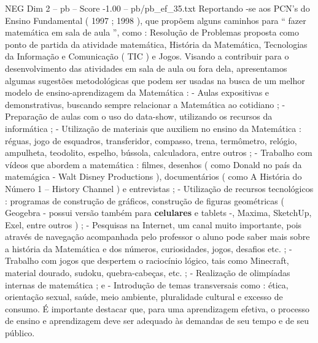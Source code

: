 \begin{textsample}{NEG Dim 2 – pb – Score -1.00 – pb/pb\_ef\_35.txt}
Reportando -se aos PCN’s do Ensino Fundamental ( 1997 ; 1998 ), que propõem alguns caminhos para “ fazer matemática em sala de aula ”, como : Resolução de Problemas proposta como ponto de partida da atividade matemática, História da Matemática, Tecnologias da Informação e Comunicação ( TIC ) e Jogos.
Visando a contribuir para o desenvolvimento das atividades em sala de aula ou fora dela, apresentamos algumas sugestões metodológicas que podem ser usadas na busca de um melhor modelo de ensino-aprendizagem da Matemática : - Aulas expositivas e demonstrativas, buscando sempre relacionar a Matemática ao cotidiano ; - Preparação de aulas com o uso do data-show, utilizando os recursos da informática ; - Utilização de materiais que auxiliem no ensino da Matemática : réguas, jogo de esquadros, transferidor, compasso, trena, termômetro, relógio, ampulheta, teodolito, espelho, bússola, calculadora, entre outros ; - Trabalho com vídeos que abordem a matemática : filmes, desenhos ( como Donald no país da matemágica - Walt Disney Productions ), documentários ( como A História do Número 1 – History Channel ) e entrevistas ; - Utilização de recursos tecnológicos : programas de construção de gráficos, construção de figuras geométricas ( Geogebra - possui versão também para \textbf{celulares} e tablets -, Maxima, SketchUp, Exel, entre outros ) ; - Pesquisas na Internet, um canal muito importante, pois através de navegação acompanhada pelo professor o aluno pode saber mais sobre a história da Matemática e dos números, curiosidades, jogos, desafios etc. ; - Trabalho com jogos que despertem o raciocínio lógico, tais como Minecraft, material dourado, sudoku, quebra-cabeças, etc. ; - Realização de olimpíadas internas de matemática ; e - Introdução de temas transversais como : ética, orientação sexual, saúde, meio ambiente, pluralidade cultural e excesso de consumo.
É importante destacar que, para uma aprendizagem efetiva, o processo de ensino e aprendizagem deve ser adequado às demandas de seu tempo e de seu público.

\end{textsample}
